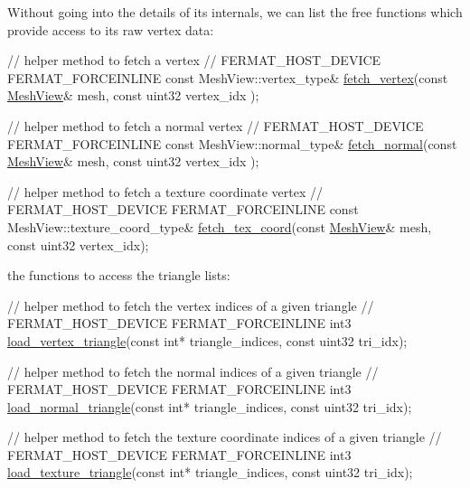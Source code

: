 \begin{DoxyParagraph}{}
Without going into the details of its internals, we can list the free functions which provide access to its raw vertex data\+: ~\newline

\begin{DoxyCode}
\textcolor{comment}{// helper method to fetch a vertex}
\textcolor{comment}{//}
FERMAT\_HOST\_DEVICE FERMAT\_FORCEINLINE
\textcolor{keyword}{const} MeshView::vertex\_type& \hyperlink{group___mesh_module_ga4b65791b4c323a93e391c4c2e88cd601}{fetch\_vertex}(\textcolor{keyword}{const} \hyperlink{struct_mesh_view}{MeshView}& mesh, \textcolor{keyword}{const} uint32 vertex\_idx
      );

\textcolor{comment}{// helper method to fetch a normal vertex}
\textcolor{comment}{//}
FERMAT\_HOST\_DEVICE FERMAT\_FORCEINLINE
\textcolor{keyword}{const} MeshView::normal\_type& \hyperlink{group___mesh_module_ga2d3d06537c1b2fc31399190bd353f6e6}{fetch\_normal}(\textcolor{keyword}{const} \hyperlink{struct_mesh_view}{MeshView}& mesh, \textcolor{keyword}{const} uint32 vertex\_idx
      );

\textcolor{comment}{// helper method to fetch a texture coordinate vertex}
\textcolor{comment}{//}
FERMAT\_HOST\_DEVICE FERMAT\_FORCEINLINE
\textcolor{keyword}{const} MeshView::texture\_coord\_type& \hyperlink{group___mesh_module_gae33ea9281c4276a5132e37c0b1331069}{fetch\_tex\_coord}(\textcolor{keyword}{const} 
      \hyperlink{struct_mesh_view}{MeshView}& mesh, \textcolor{keyword}{const} uint32 vertex\_idx);
\end{DoxyCode}
 
\end{DoxyParagraph}
\begin{DoxyParagraph}{}
the functions to access the triangle lists\+: ~\newline

\begin{DoxyCode}
\textcolor{comment}{// helper method to fetch the vertex indices of a given triangle}
\textcolor{comment}{//}
FERMAT\_HOST\_DEVICE FERMAT\_FORCEINLINE
int3 \hyperlink{group___mesh_module_ga50a8be2a2adb88816865cbd13a5aab57}{load\_vertex\_triangle}(\textcolor{keyword}{const} \textcolor{keywordtype}{int}* triangle\_indices, \textcolor{keyword}{const} uint32 tri\_idx);

\textcolor{comment}{// helper method to fetch the normal indices of a given triangle}
\textcolor{comment}{//}
FERMAT\_HOST\_DEVICE FERMAT\_FORCEINLINE
int3 \hyperlink{group___mesh_module_ga85e3684bd6c76144d9dc00a2b59cf93f}{load\_normal\_triangle}(\textcolor{keyword}{const} \textcolor{keywordtype}{int}* triangle\_indices, \textcolor{keyword}{const} uint32 tri\_idx);

\textcolor{comment}{// helper method to fetch the texture coordinate indices of a given triangle}
\textcolor{comment}{//}
FERMAT\_HOST\_DEVICE FERMAT\_FORCEINLINE
int3 \hyperlink{group___mesh_module_ga347e9722a85a86f87f7d31a63f333dd5}{load\_texture\_triangle}(\textcolor{keyword}{const} \textcolor{keywordtype}{int}* triangle\_indices, \textcolor{keyword}{const} uint32 tri\_idx);
\end{DoxyCode}
 
\end{DoxyParagraph}
